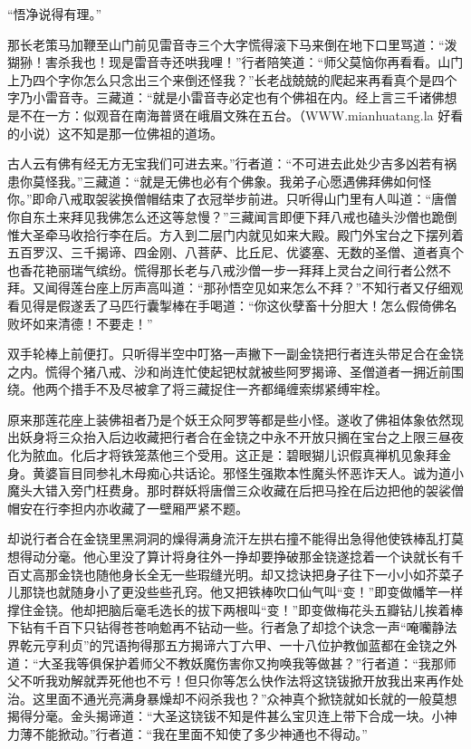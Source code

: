 \documentclass[12pt,UTF8]{ctexbook}
\begin{document}
“悟净说得有理。”

那长老策马加鞭至山门前见雷音寺三个大字慌得滚下马来倒在地下口里骂道：“泼猢狲！害杀我也！现是雷音寺还哄我哩！”行者陪笑道：“师父莫恼你再看看。山门上乃四个字你怎么只念出三个来倒还怪我？”长老战兢兢的爬起来再看真个是四个字乃小雷音寺。三藏道：“就是小雷音寺必定也有个佛祖在内。经上言三千诸佛想是不在一方：似观音在南海普贤在峨眉文殊在五台。（WWW.mianhuatang.la 好看的小说）这不知是那一位佛祖的道场。

古人云有佛有经无方无宝我们可进去来。”行者道：“不可进去此处少吉多凶若有祸患你莫怪我。”三藏道：“就是无佛也必有个佛象。我弟子心愿遇佛拜佛如何怪你。”即命八戒取袈裟换僧帽结束了衣冠举步前进。只听得山门里有人叫道：“唐僧你自东土来拜见我佛怎么还这等怠慢？”三藏闻言即便下拜八戒也磕头沙僧也跪倒惟大圣牵马收拾行李在后。方入到二层门内就见如来大殿。殿门外宝台之下摆列着五百罗汉、三千揭谛、四金刚、八菩萨、比丘尼、优婆塞、无数的圣僧、道者真个也香花艳丽瑞气缤纷。慌得那长老与八戒沙僧一步一拜拜上灵台之间行者公然不拜。又闻得莲台座上厉声高叫道：“那孙悟空见如来怎么不拜？”不知行者又仔细观看见得是假遂丢了马匹行囊掣棒在手喝道：“你这伙孽畜十分胆大！怎么假倚佛名败坏如来清德！不要走！”

双手轮棒上前便打。只听得半空中叮狢一声撇下一副金铙把行者连头带足合在金铙之内。慌得个猪八戒、沙和尚连忙使起钯杖就被些阿罗揭谛、圣僧道者一拥近前围绕。他两个措手不及尽被拿了将三藏捉住一齐都绳缠索绑紧缚牢栓。

原来那莲花座上装佛祖者乃是个妖王众阿罗等都是些小怪。遂收了佛祖体象依然现出妖身将三众抬入后边收藏把行者合在金铙之中永不开放只搁在宝台之上限三昼夜化为脓血。化后才将铁笼蒸他三个受用。这正是：碧眼猢儿识假真禅机见象拜金身。黄婆盲目同参礼木母痴心共话论。邪怪生强欺本性魔头怀恶诈天人。诚为道小魔头大错入旁门枉费身。那时群妖将唐僧三众收藏在后把马拴在后边把他的袈裟僧帽安在行李担内亦收藏了一壁厢严紧不题。

却说行者合在金铙里黑洞洞的燥得满身流汗左拱右撞不能得出急得他使铁棒乱打莫想得动分毫。他心里没了算计将身往外一挣却要挣破那金铙遂捻着一个诀就长有千百丈高那金铙也随他身长全无一些瑕缝光明。却又捻诀把身子往下一小小如芥菜子儿那铙也就随身小了更没些些孔窍。他又把铁棒吹口仙气叫“变！”即变做幡竿一样撑住金铙。他却把脑后毫毛选长的拔下两根叫“变！”即变做梅花头五瓣钻儿挨着棒下钻有千百下只钻得苍苍响魀再不钻动一些。行者急了却捻个诀念一声“唵囒静法界乾元亨利贞”的咒语拘得那五方揭谛六丁六甲、一十八位护教伽蓝都在金铙之外道：“大圣我等俱保护着师父不教妖魔伤害你又拘唤我等做甚？”行者道：“我那师父不听我劝解就弄死他也不亏！但只你等怎么快作法将这铙钹掀开放我出来再作处治。这里面不通光亮满身暴燥却不闷杀我也？”众神真个掀铙就如长就的一般莫想揭得分毫。金头揭谛道：“大圣这铙钹不知是件甚么宝贝连上带下合成一块。小神力薄不能掀动。”行者道：“我在里面不知使了多少神通也不得动。”
\end{document}
